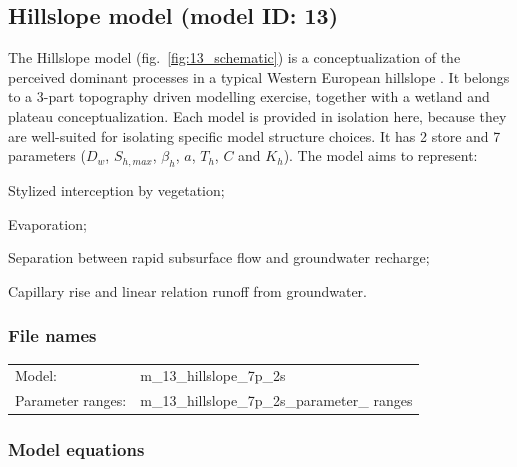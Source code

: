 \subsection{Hillslope model (model ID: 13)}
The Hillslope model (fig.~\ref{fig:13_schematic}) is a conceptualization of the perceived dominant processes in a typical Western European hillslope \citep{Savenije2010}. It belongs to a 3-part topography driven modelling exercise, together with a wetland and plateau conceptualization. Each model is provided in isolation here, because they are well-suited for isolating specific model structure choices. It has 2 store and 7 parameters ($D_w$, $S_{h,max}$, $\beta_h$, $a$, $T_h$, $C$ and $K_h$). The model aims to represent:

\begin{itemizecompact}
\item Stylized interception by vegetation;
\item Evaporation;
\item Separation between rapid subsurface flow and groundwater recharge;
\item Capillary rise and linear relation runoff from groundwater.
\end{itemizecompact}

\subsubsection{File names}
\begin{tabular}{@{}ll}
Model: &m\_13\_hillslope\_7p\_2s \\
Parameter ranges: &m\_13\_hillslope\_7p\_2s\_parameter\_ ranges \\
\end{tabular}

\subsubsection{Model equations}

